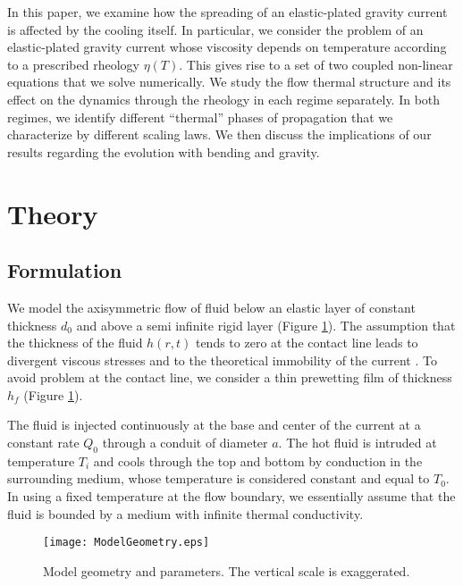 In  this paper,  we examine  how  the spreading  of an  elastic-plated
gravity current is affected by  the cooling itself.  In particular, we
consider  the  problem  of  an elastic-plated  gravity  current  whose
viscosity depends  on temperature  according to a  prescribed rheology
$\eta(T)$.   This  gives rise  to  a  set  of two  coupled  non-linear
equations  that  we solve  numerically.   We  study the  flow  thermal
structure and its effect on the  dynamics through the rheology in each
regime separately.  In both regimes, we identify different ``thermal''
phases  of  propagation  that  we characterize  by  different  scaling
laws. We  then discuss the  implications of our results  regarding the
evolution with bending and gravity.

\section{Theory}
\label{C3-sec:theory}

\subsection{Formulation}
\label{C3-sec:formulation}

We model  the axisymmetric  flow of  fluid below  an elastic  layer of
constant thickness $d_0$ and above a semi infinite rigid layer (Figure
\ref{C3-Figure2-1}).  The  assumption that the thickness  of the fluid
$h(r,t)$ tends to zero at the  contact line leads to divergent viscous
stresses   and  to   the   theoretical  immobility   of  the   current
\citep{Flitton:1999iv}.   To avoid  problem  at the  contact line,  we
consider    a    thin    prewetting   film    of    thickness    $h_f$
\citep{Lister:2013ia} (Figure \ref{C3-Figure2-1}).

The  fluid is  injected continuously  at the  base and  center of  the
current  at  a constant  rate  $Q_0$  through  a conduit  of  diameter
$a$. The hot fluid is intruded  at temperature $T_i$ and cools through
the  top and  bottom by  conduction in  the surrounding  medium, whose
temperature is  considered constant  and equal to  $T_0$.  In  using a
fixed temperature at the flow boundary, we essentially assume that the
fluid is bounded by a medium with infinite thermal conductivity.

\begin{figure}[h!]
  \begin{center}
    \graphicspath{ {/Users/thorey/Documents/These/Manuscript/Figure/Chapter3/} }
    \texttt{[image: ModelGeometry.eps]}
    \caption{Model  geometry and  parameters.  The  vertical scale  is
      exaggerated.}
    \label{C3-Figure2-1}
  \end{center}
\end{figure}

